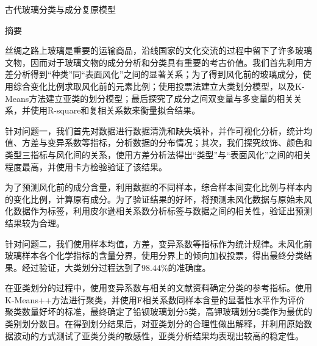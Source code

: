 \documentclass{my_paper}
\newcommand{\lunwenbiaoti}{\fontsize{15.75pt}{0}\heiti 古代玻璃分类与成分复原模型}
\newcommand{\zhaiyao}{\fontsize{14pt}{0}\heiti 摘要}
\begin{document}
\newpage
\begin{center}
\lunwenbiaoti

\vspace{2ex}
\zhaiyao
\end{center}

丝绸之路上玻璃是重要的运输商品，沿线国家的文化交流的过程中留下了许多玻璃文物，因而对于玻璃文物的成分分析和分类具有重要的考古价值。我们首先利用方差分析得到“种类”同“表面风化”之间的显著关系；为了得到风化前的玻璃成分，使用综合变化比例求取风化前的元素比例；使用投票法建立大类划分模型，以及K-Means方法建立亚类的划分模型；最后探究了成分之间双变量与多变量的相关关系，并使用R-square和复相关系数来衡量拟合结果。

针对问题一，我们首先对数据进行数据清洗和缺失填补，并作可视化分析，统计均值、方差与变异系数等指标，分析数据的分布情况；其次，我们探究纹饰、颜色和类型三指标与风化间的关系，使用方差分析法得出“类型”与“表面风化”之间的相关程度最高，并使用卡方检验验证了该结果。

为了预测风化前的成分含量，利用数据的不同样本，综合样本间变化比例与样本内的变化比例，计算原有成分。为了验证结果的好坏，将预测未风化数据与原始未风化数据作为标签，利用皮尔逊相关系数分析标签与数据之间的相关性，验证出预测结果较为合理。

针对问题二，我们使用样本均值，方差，变异系数等指标作为统计规律。未风化前玻璃样本各个化学指标的含量分界，使用分界上的倾向加权投票，得出最终分类结果。经过验证，大类划分过程达到了$98.44\%$的准确度。

在亚类划分的过程中，使用变异系数与相关的文献资料确定分类的参考指标。使用K-Means++方法进行聚类，并使用F相关系数同样本含量的显著性水平作为评价聚类数量好坏的标准，最终确定了铅钡玻璃划分5类，高钾玻璃划分5类作为最优的类别划分数目。在得到划分结果后，对亚类划分的合理性做出解释，并利用原始数据波动的方式测试了亚类分类的敏感性，亚类分析结果均表现出较高的稳定性。
\end{document}
